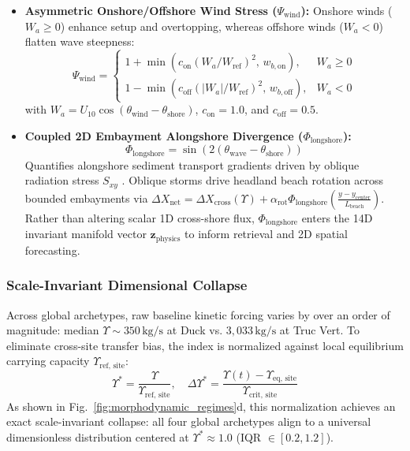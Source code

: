 \documentclass[journal]{IEEEtran}
\begin{document}
\begin{itemize}
    \item \textbf{Asymmetric Onshore/Offshore Wind Stress ($\Psi_{\text{wind}}$):} Onshore winds ($W_a \ge 0$) enhance setup and overtopping, whereas offshore winds ($W_a < 0$) flatten wave steepness:
    \begin{equation}
    \Psi_{\text{wind}} = \begin{cases} 
    1 + \min\left(c_{\text{on}} (W_a / W_{\text{ref}})^2,\, w_{b,\text{on}}\right), & W_a \ge 0 \\
    1 - \min\left(c_{\text{off}} (|W_a| / W_{\text{ref}})^2,\, w_{b,\text{off}}\right), & W_a < 0
    \end{cases}
    \label{eq:psi_wind}
    \end{equation}
    with $W_a = U_{10} \cos(\theta_{\text{wind}} - \theta_{\text{shore}})$, $c_{\text{on}} = 1.0$, and $c_{\text{off}} = 0.5$.
    \item \textbf{Coupled 2D Embayment Alongshore Divergence ($\Phi_{\text{longshore}}$):}
    \begin{equation}
    \Phi_{\text{longshore}} = \sin\left(2(\theta_{\text{wave}} - \theta_{\text{shore}})\right)
    \label{eq:phi_longshore}
    \end{equation}
    Quantifies alongshore sediment transport gradients driven by oblique radiation stress $S_{xy}$ \cite{longuethiggins1964radiation}. Oblique storms drive headland beach rotation across bounded embayments via $\Delta X_{\text{net}} = \Delta X_{\text{cross}}(\Upsilon) + \alpha_{\text{rot}} \Phi_{\text{longshore}} \left(\frac{y - y_{\text{center}}}{L_{\text{beach}}}\right)$. Rather than altering scalar 1D cross-shore flux, $\Phi_{\text{longshore}}$ enters the 14D invariant manifold vector $\mathbf{z}_{\text{physics}}$ to inform retrieval and 2D spatial forecasting.
\end{itemize}

\subsubsection{Scale-Invariant Dimensional Collapse}
Across global archetypes, raw baseline kinetic forcing varies by over an order of magnitude: median $\Upsilon \sim 350\,\text{kg/s}$ at Duck vs. $3{,}033\,\text{kg/s}$ at Truc Vert. To eliminate cross-site transfer bias, the index is normalized against local equilibrium carrying capacity $\Upsilon_{\text{ref, site}}$:
\begin{equation}
\Upsilon^* = \frac{\Upsilon}{\Upsilon_{\text{ref, site}}}, \quad \Delta\Upsilon^* = \frac{\Upsilon(t) - \Upsilon_{\text{eq, site}}}{\Upsilon_{\text{crit, site}}}
\label{eq:upsilon_star}
\end{equation}
As shown in Fig.~\ref{fig:morphodynamic_regimes}d, this normalization achieves an exact scale-invariant collapse: all four global archetypes align to a universal dimensionless distribution centered at $\Upsilon^* \approx 1.0$ (IQR $\in [0.2, 1.2]$).
\end{document}
